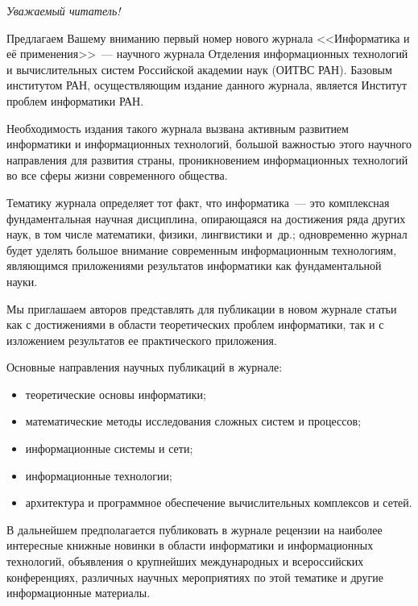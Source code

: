 {\Large  {\baselineskip=16.6pt

\vspace*{-48pt}
\begin{center}\LARGE
\textit{Уважаемый читатель!}
\end{center}
\thispagestyle{empty}

\hspace*{5mm}Предлагаем Вашему вниманию первый номер нового журнала
<<Информатика и её применения>>~--- научного журнала Отделения информационных
технологий и вычислительных систем Российской академии наук (ОИТВС РАН).
Базовым институтом РАН, осуществляющим издание данного журнала, является
Институт проблем информатики РАН.

\hspace*{5mm}Необходимость издания такого журнала вызвана активным развитием
информатики и информационных технологий, большой важностью этого научного
направления для развития страны, проникновением информационных технологий во
все сферы жизни современного общества.

\hspace*{5mm}Тематику журнала определяет тот факт, что информатика~--- это
комплексная фундаментальная научная дисциплина, опирающаяся на достижения ряда
других наук, в том числе математики, физики, лингвистики и~др.; одновременно
журнал будет уделять большое внимание современным информационным технологиям,
являющимся приложениями результатов информатики как фундаментальной науки.

\hspace*{5mm}Мы приглашаем авторов представлять для публикации в новом журнале
статьи как с достижениями в области теоретических проблем информатики, так и с
изложением результатов ее практического приложения.

\hspace*{5mm}Основные направления научных публикаций в журнале:
\begin{itemize}
\item   теоретические основы информатики;
\item математические методы исследования сложных систем и процессов;
\item  информационные системы и сети; \item  информационные технологии; \item
архитектура и программное обеспечение вычислительных комплексов и сетей.
\end{itemize}

\hspace*{5mm}В дальнейшем предполагается публиковать в журнале рецензии на
наиболее интересные книжные новинки в области информатики и информационных
технологий, объявления о крупнейших международных и всероссийских конференциях,
различных научных мероприятиях по этой тематике и другие информационные
материалы.

}}
